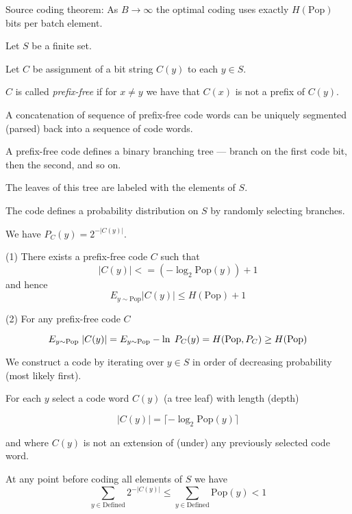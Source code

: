 \vfill
Source coding theorem: As $B \rightarrow \infty$ the optimal coding uses exactly $H(\mathrm{Pop})$
bits per batch element.


Let $S$ be a finite set.

\vfill
Let $C$ be assignment of a bit string $C(y)$ to each $y \in S$.

\vfill
$C$ is called {\em prefix-free} if for $x \not = y$ we have that $C(x)$ is not a prefix of $C(y)$.

\vfill
A concatenation of sequence of prefix-free code words can be uniquely segmented (parsed) back into a sequence of code words.


A prefix-free code defines a binary branching tree --- branch on the first code bit, then the second, and so on.

\vfill
The leaves of this tree are labeled with the elements of $S$.

\vfill
The code defines a probability distribution on $S$ by randomly selecting branches.

\vfill
We have $P_C(y) = 2^{-|C(y)|}$.


(1) There exists a prefix-free code $C$ such that
$$|C(y)| <= (- \log_2 \mathrm{Pop}(y)) + 1$$
and hence
$$E_{y\sim \mathrm{Pop}} |C(y)| \leq H(\mathrm{Pop}) +1$$

\vfill
(2) For any prefix-free code $C$

$$E_{y \sim \mathrm{Pop}}\;|C(y)| = E_{y \sim \mathrm{Pop}} -\ln \;P_C(y) = H(\mathrm{Pop},P_C) \geq H(\mathrm{Pop})$$


\vfill
We construct a code by iterating over $y \in S$ in order of decreasing probability (most likely first).

\vfill
For each $y$ select a code word $C(y)$ (a tree leaf) with length (depth)

\vfill
$$|C(y)| = \lceil - \log_2 \mathrm{Pop}(y)\rceil$$

\vfill
and where $C(y)$ is not an extension of (under) any previously selected code word.


At any point before coding all elements of $S$ we have
$$\sum_{y \in \mathrm{Defined}} 2^{-|C(y)|} \leq \sum_{y \in \mathrm{Defined}} \mathrm{Pop}(y) < 1$$

